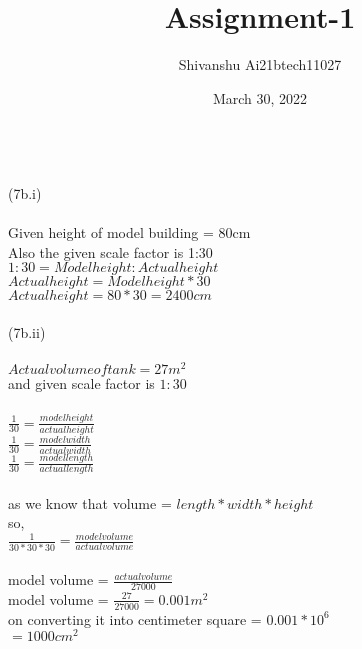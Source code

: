 \documentclass{article}
\title{Assignment-1}
\author{Shivanshu     Ai21btech11027}
\date{March 30, 2022}
\begin{document}
\maketitle
\vspace{2mm}\\
(7b.i)\\
\vspace{1mm}\\
Given height of model building = 80cm\\
Also the given scale factor is 1:30\\
\rightarrow $1 : 30 = Model height : Actual height$\\
\rightarrow $Actual height = Model height * 30$\\
\rightarrow$ Actual height = 80 * 30 = 2400 cm $\\
\vspace{2mm}\\
(7b.ii)\\
\vspace{1mm}\\
$Actual volume of tank = 27m^2 $\\
 and given  scale factor is $ 1:30 $\\
\vspace{1mm}\\
$\frac{1}{30} = \frac{model height}{actual height}$ \\
$\frac{1}{30} = \frac{model width}{actual width}$ \\
$\frac{1}{30} = \frac{model length}{actual length} $\\
\vspace{1mm}\\
as we know that volume = $length*width*height$\\
so, \\
$\frac{1}{30*30*30} = \frac{model volume}{actual volume} $\\
\vspace{1mm}\\
model volume = $\frac{actual volume}{27000} $\\
model volume = $\frac{27}{27000} = 0.001m^2$\\
on converting it into centimeter square = $0.001 * 10^6$\\
$= 1000 cm^2$\\
\end{document}

